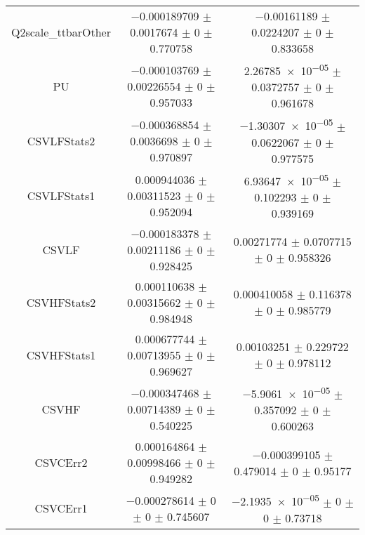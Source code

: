 \begin{table}
\begin{tabular}{ccc}
Q2scale\_ttbarOther & \num{-0.000189709} $\pm$ \num{0.0017674} $\pm$ \num{0} $\pm$ \num{0.770758} & \num{-0.00161189} $\pm$ \num{0.0224207} $\pm$ \num{0} $\pm$ \num{0.833658}\\
PU & \num{-0.000103769} $\pm$ \num{0.00226554} $\pm$ \num{0} $\pm$ \num{0.957033} & \num{2.26785e-05} $\pm$ \num{0.0372757} $\pm$ \num{0} $\pm$ \num{0.961678}\\
CSVLFStats2 & \num{-0.000368854} $\pm$ \num{0.0036698} $\pm$ \num{0} $\pm$ \num{0.970897} & \num{-1.30307e-05} $\pm$ \num{0.0622067} $\pm$ \num{0} $\pm$ \num{0.977575}\\
CSVLFStats1 & \num{0.000944036} $\pm$ \num{0.00311523} $\pm$ \num{0} $\pm$ \num{0.952094} & \num{6.93647e-05} $\pm$ \num{0.102293} $\pm$ \num{0} $\pm$ \num{0.939169}\\
CSVLF & \num{-0.000183378} $\pm$ \num{0.00211186} $\pm$ \num{0} $\pm$ \num{0.928425} & \num{0.00271774} $\pm$ \num{0.0707715} $\pm$ \num{0} $\pm$ \num{0.958326}\\
CSVHFStats2 & \num{0.000110638} $\pm$ \num{0.00315662} $\pm$ \num{0} $\pm$ \num{0.984948} & \num{0.000410058} $\pm$ \num{0.116378} $\pm$ \num{0} $\pm$ \num{0.985779}\\
CSVHFStats1 & \num{0.000677744} $\pm$ \num{0.00713955} $\pm$ \num{0} $\pm$ \num{0.969627} & \num{0.00103251} $\pm$ \num{0.229722} $\pm$ \num{0} $\pm$ \num{0.978112}\\
CSVHF & \num{-0.000347468} $\pm$ \num{0.00714389} $\pm$ \num{0} $\pm$ \num{0.540225} & \num{-5.9061e-05} $\pm$ \num{0.357092} $\pm$ \num{0} $\pm$ \num{0.600263}\\
CSVCErr2 & \num{0.000164864} $\pm$ \num{0.00998466} $\pm$ \num{0} $\pm$ \num{0.949282} & \num{-0.000399105} $\pm$ \num{0.479014} $\pm$ \num{0} $\pm$ \num{0.95177}\\
CSVCErr1 & \num{-0.000278614} $\pm$ \num{0} $\pm$ \num{0} $\pm$ \num{0.745607} & \num{-2.1935e-05} $\pm$ \num{0} $\pm$ \num{0} $\pm$ \num{0.73718}\\
\bottomrule
\end{tabular}
\end{table}